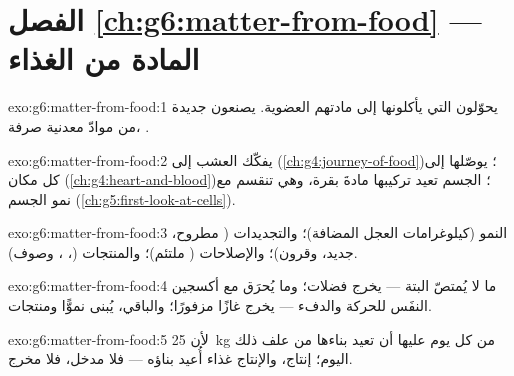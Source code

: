 \section*{الفصل \ref{ch:g6:matter-from-food} --- المادة من الغذاء}

\begin{solution}{exo:g6:matter-from-food:1}
 يحوّلون  التي يأكلونها إلى مادتهم
العضوية.  يصنعون  جديدة من موادّ معدنية صرفة،
 .
\end{solution}

\begin{solution}{exo:g6:matter-from-food:2}
 يفكّك العشب إلى 
(\cref{ch:g4:journey-of-food})؛  يوصّلها إلى كل مكان
(\cref{ch:g4:heart-and-blood})؛  الجسم تعيد تركيبها مادةَ
بقرة، وهي تنقسم مع نمو الجسم
(\cref{ch:g5:first-look-at-cells}).
\end{solution}

\begin{solution}{exo:g6:matter-from-food:3}
النمو (كيلوغرامات العجل المضافة)؛ والتجديدات ( مطروح، 
جديد، وقرون)؛ والإصلاحات ( ملتئم)؛ والمنتجات (، ،
وصوف).
\end{solution}

\begin{solution}{exo:g6:matter-from-food:4}
ما لا يُمتصّ البتة --- يخرج فضلات؛ وما يُحرَق مع أكسجين النفَس
للحركة والدفء --- يخرج غازًا مزفورًا؛ والباقي، يُبنى نموًّا
ومنتجات.
\end{solution}

\begin{solution}{exo:g6:matter-from-food:5}
لأن \qty{25}{kg} من  كل يوم  عليها أن تعيد
بناءها من علف ذلك اليوم؛  إنتاج، والإنتاج غذاء أُعيد بناؤه
--- فلا مدخل، فلا مخرج.
\end{solution}

